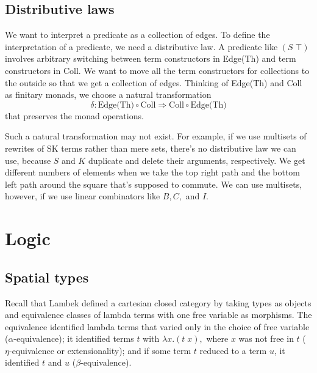 \documentclass[submission,copyright,creativecommons]{eptcs}
\newcommand{\maps}{\colon}
\begin{document}
\subsection{Distributive laws}

We want to interpret a predicate as a collection of edges.  To define the interpretation of a predicate, we need a distributive law.  A predicate like $(S\; \top)$ involves arbitrary switching between term constructors in Edge(Th) and term constructors in Coll.  We want to move all the term constructors for collections to the outside so that we get a collection of edges.  Thinking of Edge(Th) and Coll as finitary monads, we choose a natural transformation
\[ \delta\maps \mbox{Edge(Th)}\circ\mbox{Coll} \Rightarrow \mbox{Coll}\circ\mbox{Edge(Th)} \]
that preserves the monad operations.

Such a natural transformation may not exist.  For example, if we use multisets of rewrites of SK terms rather than mere sets, there's no distributive law we can use, because $S$ and $K$ duplicate and delete their arguments, respectively.  We get different numbers of elements when we take the top right path and the bottom left path around the square that's supposed to commute.  We can use multisets, however, if we use linear combinators like $B,C,$ and $I.$

\section{Logic}
\subsection{Spatial types}
Recall that Lambek defined a cartesian closed category by taking types as objects and equivalence classes of lambda terms with one free variable as morphisms.  The equivalence identified lambda terms that varied only in the choice of free variable ($\alpha\mbox{-}$equivalence); it identified terms $t$ with $\lambda x.(t\; x),$ where $x$ was not free in $t$ ($\eta\mbox{-}$equivalence or extensionality); and if some term $t$ reduced to a term $u$, it identified $t$ and $u$ ($\beta\mbox{-}$equivalence). 
\end{document}
